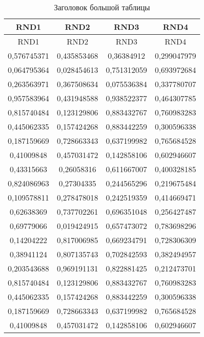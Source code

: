 \begin{longtable}{|c|c|c|c|}
	\caption{Заголовок большой таблицы}
	\label{tab:longtable}\\
	\hline
	\textbf{RND1} & \textbf{RND2} & \textbf{RND3} & \textbf{RND4} \\ \hline
	\endfirsthead

	\captioncont
	\hline
	RND1 & RND2 & RND3 & RND4 \\ \hline
	\endhead

	\hline
	\endfoot

	\hline
	\endlastfoot

0,576745371 & 0,435853468 & 0,36384912 & 0,299047979 \\ 
0,064795364 & 0,028454613 & 0,751312059 & 0,693972684 \\
0,263563971 & 0,367508634 & 0,075536384 & 0,337780707 \\
0,957583964 & 0,431948588 & 0,938522377 & 0,464307785 \\
0,815740484 & 0,123129806 & 0,883432767 & 0,760983283 \\
0,445062335 & 0,157424268 & 0,883442259 & 0,300596338 \\
0,187159669 & 0,728663343 & 0,637199982 & 0,765684528 \\
0,41009848 & 0,457031472 & 0,142858106 & 0,602946607 \\
0,43315663 & 0,26058316 & 0,611667007 & 0,400328185 \\
0,824086963 & 0,27304335 & 0,244565296 & 0,219675484 \\
0,109578811 & 0,278478018 & 0,242519359 & 0,414669471 \\
0,62638369 & 0,737702261 & 0,696351048 & 0,256427487 \\
0,69779066 & 0,019424915 & 0,657473072 & 0,783698296 \\
0,14204222 & 0,817006985 & 0,669234791 & 0,728306309 \\
0,38941124 & 0,807135743 & 0,702842593 & 0,382494957 \\
0,203543688 & 0,969191131 & 0,822881425 & 0,212473701 \\
0,815740484 & 0,123129806 & 0,883432767 & 0,760983283 \\
0,445062335 & 0,157424268 & 0,883442259 & 0,300596338 \\
0,187159669 & 0,728663343 & 0,637199982 & 0,765684528 \\
0,41009848 & 0,457031472 & 0,142858106 & 0,602946607 \\

\end{longtable}
